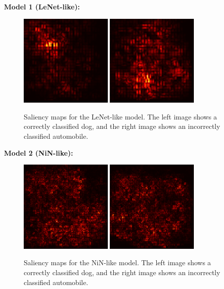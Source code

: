 \documentclass{article}[12pt]
\begin{document}
\textbf{Model 1 (LeNet-like):}
\begin{figure}[H]
    \centering
        \caption{Saliency maps for the LeNet-like model. The left image shows a correctly classified dog, and the right image shows an incorrectly classified automobile.}
        \includegraphics[width=0.4\textwidth]{saliency_correct_dog4_oldmodel.png}
        \includegraphics[width=0.4\textwidth]{saliency_incorrect_automobile10_oldmodel.png}
\end{figure}

\textbf{Model 2 (NiN-like):}
\begin{figure}[H]
    \centering
        \caption{Saliency maps for the NiN-like model. The left image shows a correctly classified dog, and the right image shows an incorrectly classified automobile.}
        \includegraphics[width=0.4\textwidth]{saliency_correct_dog4_newmodel.png}
        \includegraphics[width=0.4\textwidth]{saliency_incorrect_automobile10_newmodel.png}
\end{figure}
\end{document}
